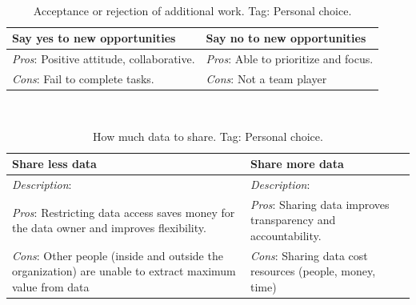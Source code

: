 \ \\

\begin{center}
\begin{table}[ht]
\begin{tabular}{ | m{\dilemmatablewidth}| m{\dilemmatablewidth} | } 
  \hline
  \textbf{Say yes to new opportunities} & 
  \textbf{Say no to new opportunities} \\ 
  \hline
  \textit{Pros}: Positive attitude, collaborative. &
  \textit{Pros}: Able to prioritize and focus. \\
  \hline
  \textit{Cons}: Fail to complete tasks. &
  \textit{Cons}: Not a team player \\  
  \hline
\end{tabular}
\caption{Acceptance or rejection of additional work.
{\tiny Tag: Personal choice.}
}
\end{table}
\end{center}

\ \\

\begin{center}
\begin{table}[ht]
\begin{tabular}{ | m{\dilemmatablewidth}| m{\dilemmatablewidth} | } 
  \hline
  \textbf{Share less data} &
  \textbf{Share more data} \\
  \hline
  \textit{Description}:  &
  \textit{Description}:  \\  
  \hline
  \textit{Pros}: Restricting data access saves money for the data owner and improves flexibility.&
  \textit{Pros}: Sharing data improves transparency and accountability. \\
  \hline
  \textit{Cons}: Other people (inside and outside the organization) are unable to extract maximum value from data & 
  \textit{Cons}: Sharing data cost resources (people, money, time) \\
  \hline
\end{tabular}
\caption{How much data to share.
{\tiny Tag: Personal choice.}
}
\label{table:data_share-vs-hide}
\end{table}
\end{center}

\ \\

